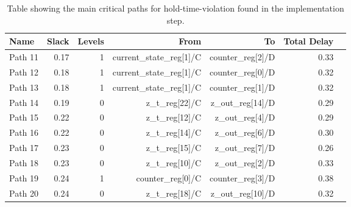 \begin{table}[H]
    \centering
    \small
    \captionsetup{skip=10pt} 
    \begin{tabular}{lrrrrrr}
        \hline
        Name    & Slack & Levels   & From                              & To                    & Total Delay \\
        \hline
        Path 11 &  0.17 &       1 &  current\_state\_reg[1]/C & counter\_reg[2]/D     & 0.33       \\
        Path 12 &  0.18 &       1 &  current\_state\_reg[1]/C & counter\_reg[0]/D     & 0.32       \\
        Path 13 &  0.18 &       1 &  current\_state\_reg[1]/C & counter\_reg[1]/D     & 0.32       \\
        Path 14 &  0.19 &       0 &  z\_t\_reg[22]/C                  & z\_out\_reg[14]/D     & 0.29       \\
        Path 15 &  0.22 &       0 &  z\_t\_reg[12]/C                  & z\_out\_reg[4]/D      & 0.29       \\
        Path 16 &  0.22 &       0 &  z\_t\_reg[14]/C                  & z\_out\_reg[6]/D      & 0.30       \\
        Path 17 &  0.23 &       0 &  z\_t\_reg[15]/C                  & z\_out\_reg[7]/D      & 0.26       \\
        Path 18 &  0.23 &       0 &  z\_t\_reg[10]/C                  & z\_out\_reg[2]/D      & 0.33       \\
        Path 19 &  0.24 &       1 &  counter\_reg[0]/C                & counter\_reg[3]/D     & 0.38       \\
        Path 20 &  0.24 &       0 &  z\_t\_reg[18]/C                  & z\_out\_reg[10]/D     & 0.32       \\
        \hline
    \end{tabular}
    \caption{Table showing the main critical paths for hold-time-violation found in the implementation step.}
    \label{tab:hold_implementation}
\end{table}

